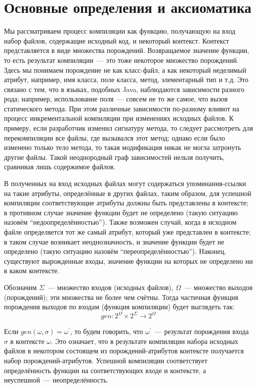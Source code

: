 \section{Основные определения и аксиоматика}

Мы рассматриваем процесс компиляции как функцию, получающую на вход набор файлов, содержащие исходный код, и некоторый контекст. Контекст представляется в виде множества порождений. Возвращаемое значение функции, то есть результат компиляции~--- это тоже некоторое множество порождений. Здесь мы понимаем порождение не как класс-файл, а как некоторый неделимый атрибут, например, имя класса, поле класса, метод, элементарный тип и т.д. Это связано с тем, что в языках, подобных Java, наблюдаются зависимости разного рода; например, использование поля~--- совсем не то же самое, что вызов статического метода. При этом различные зависимости по-разному влияют на процесс инкрементальной компиляции при изменениях исходных файлов. К примеру, если разработчик изменил сигнатуру метода, то следует рассмотреть для перекомпиляции все файлы, где вызывался этот метод; однако если было изменено только тело метода, то такая модификация никак не могла затронуть другие файлы. Такой неоднородный граф зависимостей нельзя получить, сравнивая лишь содержимое файлов.

В полученных на вход исходных файлах могут содержаться упоминания-ссылки на такие атрибуты, определённые в других файлах, таким образом, для успешной компиляции соответствующие атрибуты должны быть представлены в контексте; в противном случае значение функции будет не определено (такую ситуацию назовём ``недоопределённостью''). Также возможен случай, когда в исходном файле определяется тот же самый атрибут, который уже представлен в контексте; в таком случае возникает неоднозначность, и значение функции будет не определено (такую ситуацию назовём ``переопределённостью''). Наконец, существуют вырожденные входы, значение функции на которых не определено ни в каком контексте.

Обозначим $\Sigma$~--- множество входов (исходных файлов), $\Omega$~--- множество выходов (порождений); эти множества не более чем счётны. Тогда частичная функция порождения выходов по входам (функция компиляции) будет выглядеть так:
$$gen : 2^\Omega \times 2^\Sigma \to 2^\Omega$$

Если $gen(\omega, \sigma) = \omega^\prime$, то будем говорить, что $\omega^\prime$~--- результат порождения входа $\sigma$ в контексте $\omega$. Это означает, что в результате компиляции набора исходных файлов в некотором состоящем из порождений-атрибутов контексте получается набор порождений-атрибутов. Успешной компиляции соответствует определённость функции на соответствующих входе и контексте, а неуспешной~--- неопределённость.

